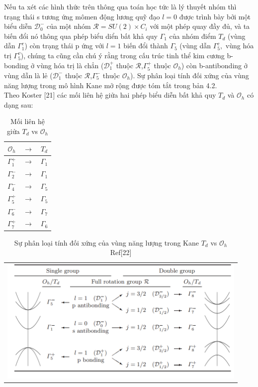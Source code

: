 Nếu ta xét các hình thức trên thông qua toán học tức là lý thuyết nhóm  thì trạng thái s tương ứng mômen động lương quỹ đạo $l=0$ được trình bày bởi một biểu diễn $\mathcal{D}_0^{-}$ của một nhóm $\mathcal{R}=SU(2)\times C_i$ với một phép quay đầy đủ, và ta biến đổi nó thông qua phép biểu diển bất khả quy $\Gamma_1$ của nhóm điểm $T_d$ (vùng dẫn $\Gamma_1^{c}$) còn trạng thái p ứng với $l=1$ biến đổi thành $\Gamma_5$ (vùng dẫn $\Gamma_5^{c},$ vùng hóa trị $\Gamma_5^{v}$), chúng ta cũng cần chú ý rằng trong cấu trúc tinh thể kim cương b-bonding ở vùng hóa trị là chẳn ($\mathcal{D}_1^{+}$ thuộc $\mathcal{R}$,$\Gamma_5^{+}$ thuộc $\mathcal{O}_h$) còn b-antibonding ở vùng dẫn là lẻ ($\mathcal{D}_1^{-}$ thuộc $\mathcal{R}$,$\Gamma_5^{-}$ thuộc $\mathcal{O}_h$). Sự phân loại tính đối xứng của vùng năng lượng trong mô hình Kane mở rộng được tóm tắt trong bản 4.2.\\
Theo Koster [21] các mối liên hệ giửa hai phép biểu diễn bất khả quy $T_d$ và $\mathcal{O}_h$ có dạng sau:
\begin{table}[ht]
\caption{Mối liên hệ giửa $T_d$ vs $\mathcal{O}_h$}
\centering
\begin{tabular}{c c c}
\hline\hline %
$\mathcal{O}_h$ &$\longrightarrow$&$ T_d$\\[0.5ex]
\hline
$\Gamma_1^{+}$ &$\longrightarrow$ &$\Gamma_1$\\
$\Gamma_2^{-}$ &$\longrightarrow$ &$\Gamma_1$\\
$\Gamma_4^{-}$ &$\longrightarrow$ &$\Gamma_5$\\
$\Gamma_5^{+}$ &$\longrightarrow$ &$\Gamma_5$\\
$\Gamma_6^{-}$ &$\longrightarrow$ &$\Gamma_7$\\
$\Gamma_7^{+}$ &$\longrightarrow$ &$\Gamma_6$\\[1ex]
\hline
\end{tabular}
\label{table:nonlin}
\end{table}
\begin{table}[hc]
\caption{Sự phân loại tính đối xứng của vùng năng lượng trong Kane $T_d$ vs $\mathcal{O}_h$ Ref[22]}
\centering
\begin{tabular}{c}
\includegraphics[width=1.0\textwidth, height=230px]{./Figures/hinh3.png}
\end{tabular}
\label{table:Symmetry}
\end{table}
